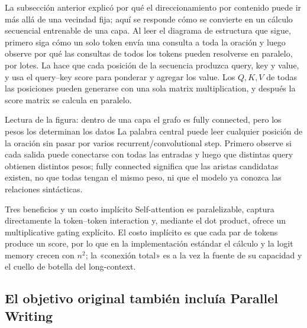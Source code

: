 La subsección anterior explicó por qué el direccionamiento por contenido puede ir más allá de una vecindad fija; aquí se responde cómo se convierte en un cálculo secuencial entrenable de una capa. Al leer el diagrama de estructura que sigue, primero siga cómo un solo token envía una consulta a toda la oración y luego observe por qué las consultas de todos los tokens pueden resolverse en paralelo, por lotes. La  hace que cada posición de la secuencia produzca query, key y value, y usa el query--key score para ponderar y agregar los value. Los $Q,K,V$ de todas las posiciones pueden generarse con una sola matrix multiplication, y después la score matrix se calcula en paralelo.


\begin{knowledgebox}{Lectura de la figura: dentro de una capa el grafo es fully connected, pero los pesos los determinan los datos}
La palabra central puede leer cualquier posición de la oración sin pasar por varios recurrent/convolutional step. Primero observe si cada salida puede conectarse con todas las entradas y luego que distintas query obtienen distintos pesos; fully connected significa que las aristas candidatas existen, no que todas tengan el mismo peso, ni que el modelo ya conozca las relaciones sintácticas.
\end{knowledgebox}


\begin{importantbox}{Tres beneficios y un costo implícito}
Self-attention es paralelizable, captura directamente la token--token interaction y, mediante el dot product, ofrece un multiplicative gating explícito. El costo implícito es que cada par de tokens produce un score, por lo que en la implementación estándar el cálculo y la logit memory crecen con $n^2$; la «conexión total» es a la vez la fuente de su capacidad y el cuello de botella del long-context.
\end{importantbox}

\subsection{El objetivo original también incluía Parallel Writing}

